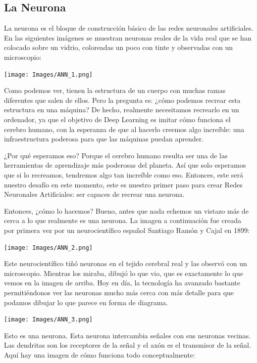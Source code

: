 \documentclass[
]{book}
\begin{document}
\hypertarget{la-neurona}{%
\subsection{La Neurona}\label{la-neurona}}

La neurona es el bloque de construcción básico de las redes neuronales artificiales. En las siguientes imágenes se muestran neuronas reales de la vida real que se han colocado sobre un vidrio, coloreadas un poco con tinte y observadas con un microscopio:

\texttt{[image: Images/ANN\_1.png]}

Como podemos ver, tienen la estructura de un cuerpo con muchas ramas diferentes que salen de ellos. Pero la pregunta es: ¿cómo podemos recrear esta estructura en una máquina? De hecho, realmente necesitamos recrearlo en un ordenador, ya que el objetivo de Deep Learning es imitar cómo funciona el cerebro humano, con la esperanza de que al hacerlo creemos algo increíble: una infraestructura poderosa para que las máquinas puedan aprender.

¿Por qué esperamos eso? Porque el cerebro humano resulta ser una de las herramientas de aprendizaje más poderosas del planeta. Así que solo esperamos que si lo recreamos, tendremos algo tan increíble como eso. Entonces, este será nuestro desafío en este momento, este es nuestro primer paso para crear Redes Neuronales Artificiales: ser capaces de recrear una neurona.

Entonces, ¿cómo lo hacemos? Bueno, antes que nada echemos un vistazo más de cerca a lo que realmente es una neurona. La imagen a continuación fue creada por primera vez por un neurocientífico español Santiago Ramón y Cajal en 1899:

\texttt{[image: Images/ANN\_2.png]}

Este neurocientífico tiñó neuronas en el tejido cerebral real y las observó con un microscopio. Mientras los miraba, dibujó lo que vio, que es exactamente lo que vemos en la imagen de arriba. Hoy en día, la tecnología ha avanzado bastante permitiéndonos ver las neuronas mucho más cerca con más detalle para que podamos dibujar lo que parece en forma de diagrama.

\texttt{[image: Images/ANN\_3.png]}

Esto es una neurona. Esta neurona intercambia señales con sus neuronas vecinas. Las dendritas son los receptores de la señal y el axón es el transmisor de la señal. Aquí hay una imagen de cómo funciona todo conceptualmente:
\end{document}
